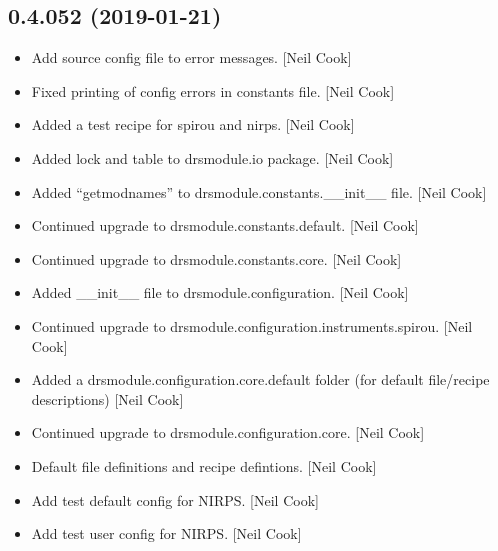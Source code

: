 \documentclass[a4paper,10pt,english]{report}
\begin{document}
\subsection{0.4.052 (2019-01-21)}
\label{\detokenize{misc/changelog:id210}}\begin{itemize}
\item {} 
Add source config file to error messages. {[}Neil Cook{]}

\item {} 
Fixed printing of config errors in constants file. {[}Neil Cook{]}

\item {} 
Added a test recipe for spirou and nirps. {[}Neil Cook{]}

\item {} 
Added lock and table to drsmodule.io package. {[}Neil Cook{]}

\item {} 
Added “getmodnames” to drsmodule.constants.\_\_init\_\_ file. {[}Neil Cook{]}

\item {} 
Continued upgrade to drsmodule.constants.default. {[}Neil Cook{]}

\item {} 
Continued upgrade to drsmodule.constants.core. {[}Neil Cook{]}

\item {} 
Added \_\_init\_\_ file to drsmodule.configuration. {[}Neil Cook{]}

\item {} 
Continued upgrade to drsmodule.configuration.instruments.spirou. {[}Neil
Cook{]}

\item {} 
Added a drsmodule.configuration.core.default folder (for default
file/recipe descriptions) {[}Neil Cook{]}

\item {} 
Continued upgrade to drsmodule.configuration.core. {[}Neil Cook{]}

\item {} 
Default file definitions and recipe defintions. {[}Neil Cook{]}

\item {} 
Add test default config for NIRPS. {[}Neil Cook{]}

\item {} 
Add test user config for NIRPS. {[}Neil Cook{]}

\end{itemize}
\end{document}
